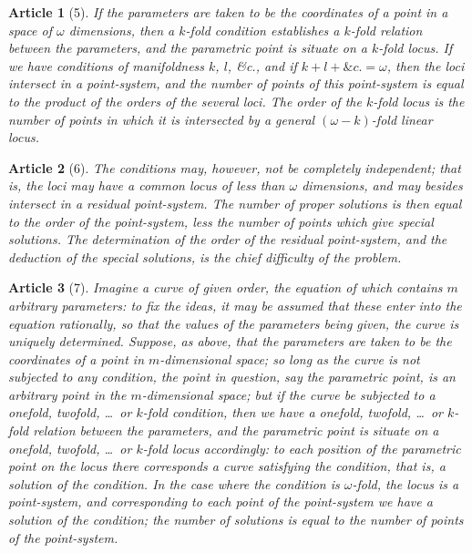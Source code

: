 \documentclass[11pt,a4paper]{article}
\theoremstyle{cayley}
\newtheorem{art}{Article}
\begin{document}
\begin{art}[5]
If the parameters are taken to be the coordinates of a point in a space of $\omega$ dimensions, then a $k$-fold condition establishes a $k$-fold relation between the parameters, and the parametric point is situate on a $k$-fold locus. If we have conditions of manifoldness $k$, $l$, \&c., and if $k+l+\&c. = \omega$, then the loci intersect in a point-system, and the number of points of this point-system is equal to the product of the orders of the several loci. The order of the $k$-fold locus is the number of points in which it is intersected by a general $(\omega-k)$-fold linear locus.
\end{art}

\begin{art}[6]
The conditions may, however, not be completely independent; that is, the loci may have a common locus of less than $\omega$ dimensions, and may besides intersect in a residual point-system. The number of proper solutions is then equal to the order of the point-system, less the number of points which give special solutions. The determination of the order of the residual point-system, and the deduction of the special solutions, is the chief difficulty of the problem.
\end{art}

\begin{art}[7]
Imagine a curve of given order, the equation of which contains $m$ arbitrary parameters: to fix the ideas, it may be assumed that these enter into the equation rationally, so that the values of the parameters being given, the curve is uniquely determined. Suppose, as above, that the parameters are taken to be the coordinates of a point in $m$-dimensional space; so long as the curve is not subjected to any condition, the point in question, say the parametric point, is an arbitrary point in the $m$-dimensional space; but if the curve be subjected to a onefold, twofold, \dots\ or $k$-fold condition, then we have a onefold, twofold, \dots\ or $k$-fold relation between the parameters, and the parametric point is situate on a onefold, twofold, \dots\ or $k$-fold locus accordingly: to each position of the parametric point on the locus there corresponds a curve satisfying the condition, that is, a solution of the condition. In the case where the condition is $\omega$-fold, the locus is a point-system, and corresponding to each point of the point-system we have a solution of the condition; the number of solutions is equal to the number of points of the point-system.
\end{art}
\end{document}
